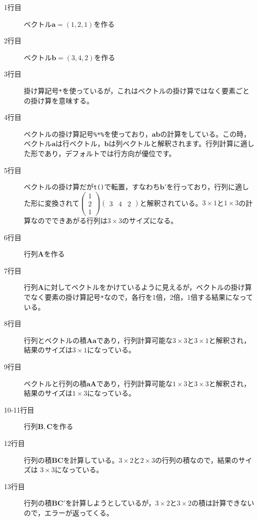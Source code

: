 \begin{description}
	\item[1行目] ベクトル$\bm{a}=(1,2,1)$を作る
	\item[2行目] ベクトル$\bm{b}=(3,4,2)$を作る
	\item[3行目] 掛け算記号\verb|*|を使っているが，これはベクトルの掛け算ではなく要素ごとの掛け算を意味する。
	\item[4行目] ベクトルの掛け算記号\verb|%*%|を使っており，$\bm{ab}$の計算をしている。この時，ベクトル$\bm{a}$は行ベクトル，$\bm{b}$は列ベクトルと解釈されます。行列計算に適した形であり，デフォルトでは行方向が優位です。
	\item[5行目] ベクトルの掛け算だが\texttt{t()}で転置，すなわち$\bm{b}'$を行っており，行列に適した形に変換されて$\begin{pmatrix}1\\2\\1\end{pmatrix}\begin{pmatrix}3&4&2\end{pmatrix}$と解釈されている。$3\times1$と$1\times3$の計算なのでできあがる行列は$3\times3$のサイズになる。
	\item[6行目] 行列$\bm{A}$を作る
	\item[7行目] 行列$\bm{A}$に対してベクトルをかけているように見えるが，ベクトルの掛け算でなく要素の掛け算記号\verb|*|なので，各行を1倍，2倍，1倍する結果になっている。
	\item[8行目] 行列とベクトルの積$\bm{Aa}$であり，行列計算可能な$3\times3$と$3\times1$と解釈され，結果のサイズは$3 \times 1$になっている。
	\item[9行目] ベクトルと行列の積$\bm{aA}$であり，行列計算可能な$1 \times 3$と$3 \times 3$と解釈され，結果のサイズは$1 \times 3$になっている。
	\item[10-11行目] 行列$\bm{B,C}$を作る
	\item[12行目] 行列の積$\bm{BC}$を計算している。$3\times2$と$2\times3$の行列の積なので，結果のサイズは $3\times3$になっている。
	\item[13行目] 行列の積$\bm{BC'}$を計算しようとしているが，$3\times2$と$3\times2$の積は計算できないので，エラーが返ってくる。
\end{description}
